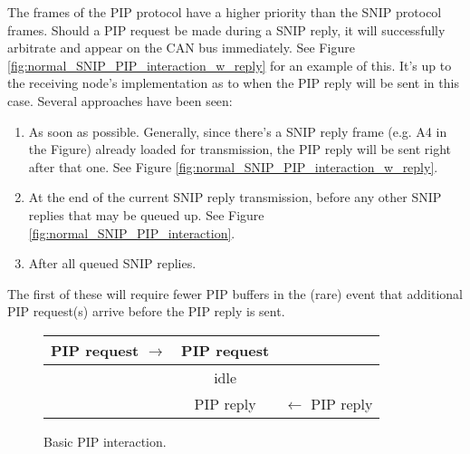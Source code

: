 \documentclass[11pt]{article}
\begin{document}
The frames of the PIP protocol have a higher priority than
the SNIP protocol frames. 
Should a PIP request be made during a SNIP reply, it will 
successfully arbitrate and appear on the CAN bus immediately.  See
Figure \ref{fig:normal_SNIP_PIP_interaction_w_reply}
for an example of this. 
It's up to the receiving node's implementation 
as to when the PIP reply will be sent in this case. 
Several approaches have been seen:
\begin{enumerate}
\item As soon as possible.  Generally, since 
there's a SNIP reply frame (e.g. A4 in the Figure) already loaded
for transmission, the PIP reply will be sent right after that one.
See 
Figure \ref{fig:normal_SNIP_PIP_interaction_w_reply}.
\item At the end of the current SNIP reply transmission, before any other
SNIP replies that may be queued up.
See 
Figure \ref{fig:normal_SNIP_PIP_interaction}.
\item After all queued SNIP replies.
\end{enumerate}
The first of these will require fewer PIP buffers
in the (rare) event that additional PIP request(s) 
arrive before the PIP reply is sent. 

\begin{figure}[!hbp]
\begin{center}
\begin{tabular}{ r | c | l}
\hline
PIP request $\rightarrow$ & PIP request & \\ \hline

    & idle & \\ \hline

    & PIP reply  & $\leftarrow$ PIP reply \\ \hline
\end{tabular}
\end{center}
\caption{Basic PIP interaction.}
\label{fig:PIP_interaction}
\end{figure}
\end{document}
